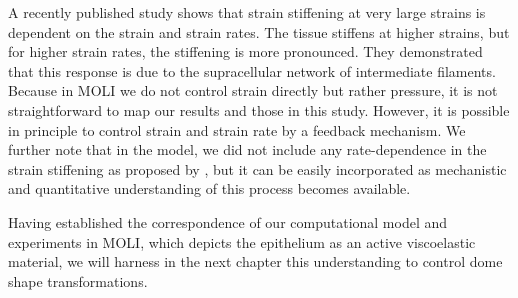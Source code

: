 A recently published study \cite{duque2023} shows that strain stiffening at very large strains is dependent on the strain and strain rates. The tissue stiffens at higher strains, but for higher strain rates, the stiffening is more pronounced.%
They demonstrated that this response is due to the supracellular network of intermediate filaments. Because in MOLI we do not control strain directly but rather pressure, it is not straightforward to map our results and those in this study. However, it is possible in principle to control strain and strain rate by a feedback mechanism. %
We further note that in the model, we did not include any rate-dependence in the strain stiffening as proposed by \citet{duque2023}, but it can be easily incorporated as mechanistic and quantitative understanding of this process becomes available.


Having established the correspondence of our computational model and experiments in MOLI, which depicts  the epithelium as an active viscoelastic material, we will harness in the next chapter this understanding to control dome shape transformations.
